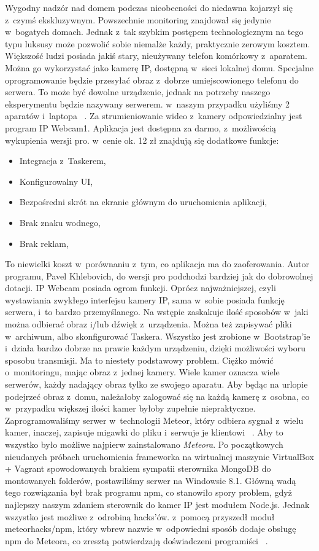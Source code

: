 \documentclass{xmgr}
\begin{document}
	Wygodny nadzór nad domem podczas nieobecności do niedawna kojarzył się z~czymś ekskluzywnym. Powszechnie monitoring znajdował się jedynie w~bogatych domach. Jednak z~tak szybkim postępem technologicznym na tego typu luksusy może pozwolić sobie niemalże każdy, praktycznie zerowym kosztem. Większość ludzi posiada jakiś stary, nieużywany telefon komórkowy z~aparatem. Można go wykorzystać jako kamerę IP, dostępną w~sieci lokalnej domu. Specjalne oprogramowanie będzie przesyłać obraz z~dobrze umiejscowionego telefonu do serwera. To może być dowolne urządzenie, jednak na potrzeby naszego eksperymentu będzie nazywany serwerem. w~naszym przypadku użyliśmy 2 aparatów i~laptopa~ \cite{Learning}.
	Za strumieniowanie wideo z~kamery odpowiedzialny jest program IP Webcam1. Aplikacja jest dostępna za darmo, z~możliwością wykupienia wersji pro. w~cenie ok. 12 zł znajdują się dodatkowe funkcje:
\begin{itemize}
\item Integracja z~Taskerem,
\item Konfigurowalny UI,
\item Bezpośredni skrót na ekranie głównym do uruchomienia aplikacji,
\item Brak znaku wodnego,
\item Brak reklam,
\end{itemize}
	To niewielki koszt w~porównaniu z~tym, co aplikacja ma do zaoferowania. Autor programu, Pavel Khlebovich, do wersji pro  podchodzi bardziej jak do dobrowolnej dotacji.
	IP Webcam posiada ogrom funkcji. Oprócz najważniejszej, czyli wystawiania zwykłego interfejsu kamery IP, sama w~sobie posiada funkcję serwera, i~to bardzo przemyślanego. Na wstępie zaskakuje ilość sposobów w~jaki można odbierać obraz i/lub dźwięk z~urządzenia. Można też zapisywać pliki w~archiwum, albo skonfigurować Taskera. Wszystko jest zrobione w~Bootstrap'ie i~działa bardzo dobrze na prawie każdym urządzeniu, dzięki możliwości wyboru sposobu transmisji.
	Ma to niestety podstawowy problem. Ciężko mówić o~monitoringu, mając obraz z~jednej kamery. Wiele kamer oznacza wiele serwerów, każdy nadający obraz tylko ze swojego aparatu. Aby będąc na urlopie podejrzeć obraz z~domu, należałoby zalogować się na każdą kamerę z~osobna, co w~przypadku większej ilości kamer byłoby zupełnie niepraktyczne. Zaprogramowaliśmy serwer w~technologii Meteor, który odbiera sygnał z~wielu kamer, inaczej, zapisuje migawki do pliku i~serwuje je klientowi~ \cite{Started}.
	Aby to wszystko było możliwe najpierw zainstalowano \emph{Meteora}. Po początkowych nieudanych próbach uruchomienia frameworka na wirtualnej maszynie VirtualBox + Vagrant spowodowanych brakiem sympatii sterownika MongoDB do montowanych folderów, postawiliśmy serwer na Windowsie 8.1. Główną wadą tego rozwiązania był brak programu npm, co stanowiło spory problem, gdyż najlepszy naszym zdaniem sterownik do kamer IP jest modułem Node.js. Jednak wszystko jest możliwe z~odrobiną hacks'ów. z~pomocą przyszedł moduł meteorhacks/npm, który wbrew nazwie w~odpowiedni sposób dodaje obsługę npm do Meteora, co zresztą potwierdzają doświadczeni programiści~ \cite{Npm:2014:CMC}.
\end{document}
